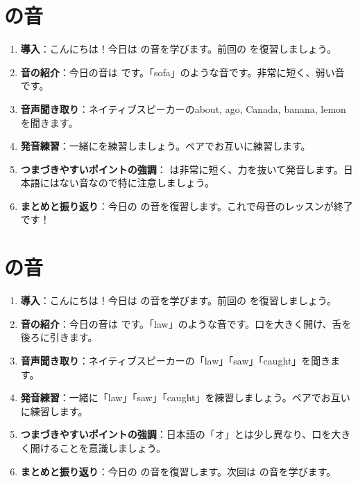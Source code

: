 \documentclass[book,jafontscale=0.9247]{jlreq}
\begin{document}
\section{\textipa{/\textschwa /} の音}
\begin{enumerate}
    \item \textbf{導入}：こんにちは！今日は \textipa{/\textschwa /} の音を学びます。前回の  を復習しましょう。
    \item \textbf{音の紹介}：今日の音は \textipa{/\textschwa /} です。「sofa」のような音です。非常に短く、弱い音です。
    \item \textbf{音声聞き取り}：ネイティブスピーカーのabout, ago, Canada, banana, lemonを聞きます。
    \item \textbf{発音練習}：一緒にを練習しましょう。ペアでお互いに練習します。
    \item \textbf{つまづきやすいポイントの強調}： \textipa{/\textschwa /} は非常に短く、力を抜いて発音します。日本語にはない音なので特に注意しましょう。
    \item \textbf{まとめと振り返り}：今日の \textipa{/\textschwa /} の音を復習します。これで母音のレッスンが終了です！
\end{enumerate}
\section{\textipa{/\textopeno :/} の音}
\begin{enumerate}
    \item \textbf{導入}：こんにちは！今日は \textipa{/\textopeno :/} の音を学びます。前回の  を復習しましょう。
    \item \textbf{音の紹介}：今日の音は \textipa{/\textopeno:/} です。「law」のような音です。口を大きく開け、舌を後ろに引きます。
    \item \textbf{音声聞き取り}：ネイティブスピーカーの「law」「saw」「caught」を聞きます。
    \item \textbf{発音練習}：一緒に「law」「saw」「caught」を練習しましょう。ペアでお互いに練習します。
    \item \textbf{つまづきやすいポイントの強調}：日本語の「オ」とは少し異なり、口を大きく開けることを意識しましょう。
    \item \textbf{まとめと振り返り}：今日の  の音を復習します。次回は  の音を学びます。
\end{enumerate}
\newpage
\end{document}
